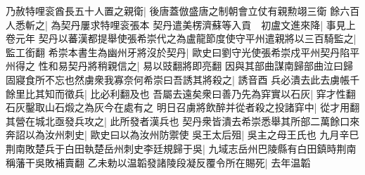 乃赦特哩衮酋長五十人置之親衛|{
	後唐蓋倣盛唐之制朝會立仗有親勲翊三衛}
餘六百人悉斬之|{
	為契丹屢求特哩衮張本}
契丹遣美楞濟蘇等入貢　初盧文進來降|{
	事見上卷元年}
契丹以蕃漢都提舉使張希崇代之為盧龍節度使守平州遣親將以三百騎監之|{
	監工銜翻}
希崇本書生為幽州牙將沒於契丹|{
	歐史曰劉守光使張希崇戍平州契丹陷平州得之}
性和易契丹將稍親信之|{
	易以豉翻將即亮翻}
因與其部曲謀南歸部曲泣曰歸固寢食所不忘也然虜衆我寡奈何希崇曰吾誘其將殺之|{
	誘音酉}
兵必潰去此去虜帳千餘里比其知而徵兵|{
	比必利翻及也}
吾屬去遠矣衆曰善乃先為穽實以石灰|{
	穽才性翻石灰鑿取山石煅之為灰今在處有之}
明日召虜將飲醉并從者殺之投諸穽中|{
	從才用翻}
其營在城北亟發兵攻之|{
	此所發者漢兵也}
契丹衆皆潰去希崇悉舉其所部二萬餘口來奔詔以為汝州刺史|{
	歐史曰以為汝州防禦使}
吳王太后殂|{
	吳主之母王氏也}
九月辛巳荆南敗楚兵于白田執楚岳州刺史李廷規歸于吳|{
	九域志岳州巴陵縣有白田鎮時荆南稱藩干吳敗補賣翻}
乙未勅以温韜發諸陵段凝反覆令所在賜死|{
	去年温韜}


